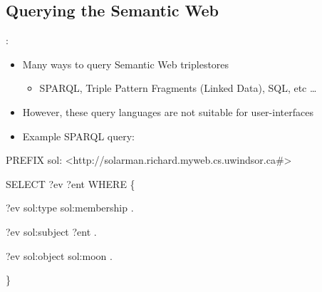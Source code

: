 \documentclass[logoontitle,tabu,supertabular,aspectratio=43]{preney-uwindsor-beamer}
\begin{document}
    \subsection{Querying the Semantic Web}
    \begin{frame}{\insertsection: \insertsubsection}
        \begin{itemize}
            \item Many ways to query Semantic Web triplestores
            \begin{itemize}
                \item SPARQL, Triple Pattern Fragments (Linked Data), SQL, etc \ldots
            \end{itemize}
            \item However, these query languages are not suitable for user-interfaces
            \item Example SPARQL query:
        \end{itemize}
        \begin{block}

            \ttfamily

            PREFIX sol: <http://solarman.richard.myweb.cs.uwindsor.ca\#>

            SELECT ?ev ?ent WHERE \{

            \hspace{5em}    ?ev sol:type sol:membership .

            \hspace{5em}    ?ev sol:subject ?ent .

            \hspace{5em}    ?ev sol:object sol:moon .

            \}
        \end{block}
    \end{frame}
\end{document}
